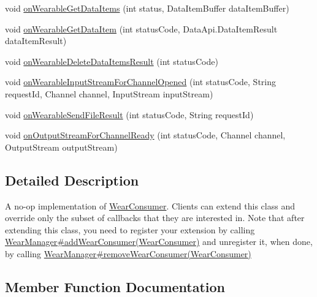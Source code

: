 \begin{DoxyCompactItemize}
\item 
void \hyperlink{classcom_1_1google_1_1devrel_1_1wcl_1_1callbacks_1_1AbstractWearConsumer_ab649cb01d5b31860ea034e0e540917e2}{on\+Wearable\+Get\+Data\+Items} (int status, Data\+Item\+Buffer data\+Item\+Buffer)
\item 
void \hyperlink{classcom_1_1google_1_1devrel_1_1wcl_1_1callbacks_1_1AbstractWearConsumer_a75d7a8e2069a8f254ee7301f9a8db248}{on\+Wearable\+Get\+Data\+Item} (int status\+Code, Data\+Api.\+Data\+Item\+Result data\+Item\+Result)
\item 
void \hyperlink{classcom_1_1google_1_1devrel_1_1wcl_1_1callbacks_1_1AbstractWearConsumer_a06ef5899c442c2404f924e291a3427de}{on\+Wearable\+Delete\+Data\+Items\+Result} (int status\+Code)
\item 
void \hyperlink{classcom_1_1google_1_1devrel_1_1wcl_1_1callbacks_1_1AbstractWearConsumer_af16301727a01a881b29937a695cf4ca2}{on\+Wearable\+Input\+Stream\+For\+Channel\+Opened} (int status\+Code, String request\+Id, Channel channel, Input\+Stream input\+Stream)
\item 
void \hyperlink{classcom_1_1google_1_1devrel_1_1wcl_1_1callbacks_1_1AbstractWearConsumer_a48692b76b9c02fc20675a64fffced7b7}{on\+Wearable\+Send\+File\+Result} (int status\+Code, String request\+Id)
\item 
void \hyperlink{classcom_1_1google_1_1devrel_1_1wcl_1_1callbacks_1_1AbstractWearConsumer_ac8d1fb027a746525b560fb6daa3a729f}{on\+Output\+Stream\+For\+Channel\+Ready} (int status\+Code, Channel channel, Output\+Stream output\+Stream)
\end{DoxyCompactItemize}


\subsection{Detailed Description}
A no-\/op implementation of \hyperlink{interfacecom_1_1google_1_1devrel_1_1wcl_1_1callbacks_1_1WearConsumer}{Wear\+Consumer}. Clients can extend this class and override only the subset of callbacks that they are interested in. Note that after extending this class, you need to register your extension by calling \hyperlink{classcom_1_1google_1_1devrel_1_1wcl_1_1WearManager_ab1ead896194d81adf7750d73e146d7d4}{Wear\+Manager\#add\+Wear\+Consumer(\+Wear\+Consumer)} and unregister it, when done, by calling \hyperlink{classcom_1_1google_1_1devrel_1_1wcl_1_1WearManager_a473eca98cfa817fb734f7342bc045ce1}{Wear\+Manager\#remove\+Wear\+Consumer(\+Wear\+Consumer)} 

\subsection{Member Function Documentation}
